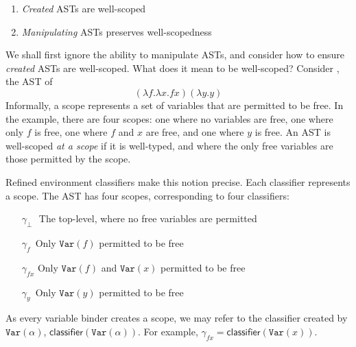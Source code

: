 \begin{enumerate}
  \item \textit{Created} ASTs are well-scoped
  \item \textit{Manipulating} ASTs preserves well-scopedness 
\end{enumerate}

We shall first ignore the ability to manipulate ASTs, and consider how to ensure \textit{created} ASTs are well-scoped. What does it mean to be well-scoped? Consider , the AST of 
\[(\lambda f. \lambda x. f x) (\lambda y. y)\]
Informally, a scope represents a set of variables that are permitted to be free. In the example, there are four scopes: one where no variables are free, one where only $f$ is free, one where $f$ and $x$ are free, and one where $y$ is free. An AST is well-scoped \textit{at a scope} if it is well-typed, and where the only free variables are those permitted by the scope. 

Refined environment classifiers make this notion precise. Each classifier represents a scope. The AST has four scopes, corresponding to four classifiers:
\begin{itemize}
\item[$\gamma_{\bot}$\,\,] The top-level, where no free variables are permitted 
\item[$\gamma_{f}$\;\,] Only $\texttt{Var}(f)$ permitted to be free
\item[$\gamma_{fx}$] Only $\texttt{Var}(f)$ and $\texttt{Var}(x)$ permitted to be free 
\item[$\gamma_{y}$\;\,] Only $\texttt{Var}(y)$ permitted to be free
\end{itemize}
As every variable binder creates a scope, we may refer to the classifier created by $\texttt{Var}(\alpha)$, $\textsf{classifier}(\texttt{Var}(\alpha))$. For example, $\gamma_{fx}= \textsf{classifier}(\texttt{Var}(x))$.


